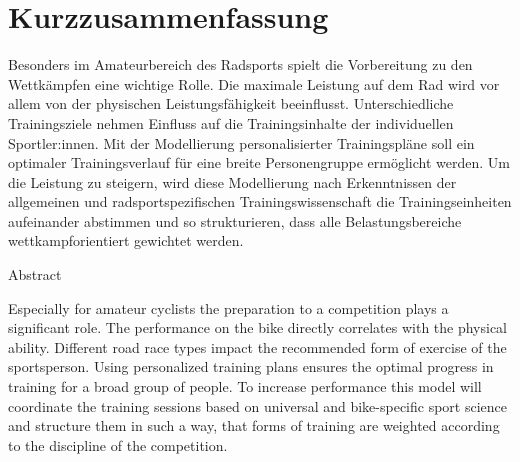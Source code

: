 \chapter*{Kurzzusammenfassung}
\label{sec:abstract}
\vspace*{-10mm}
Besonders im Amateurbereich des Radsports spielt die Vorbereitung zu den Wettkämpfen eine wichtige Rolle. Die maximale Leistung auf dem Rad wird vor allem von der physischen Leistungsfähigkeit beeinflusst. Unterschiedliche Trainingsziele nehmen Einfluss auf die Trainingsinhalte der individuellen Sportler:innen. Mit der Modellierung personalisierter Trainingspläne soll ein optimaler Trainingsverlauf für eine breite Personengruppe ermöglicht werden.
Um die Leistung zu steigern, wird diese Modellierung nach Erkenntnissen der allgemeinen und radsportspezifischen Trainingswissenschaft die Trainingseinheiten aufeinander abstimmen und so strukturieren, dass alle Belastungsbereiche wettkampforientiert gewichtet werden.
\vspace*{20mm}

{Abstract}
\label{sec:abstract-diff}

Especially for amateur cyclists the preparation to a competition plays a significant role. The performance on the bike directly correlates with the physical ability. Different road race types impact the recommended form of exercise of the sportsperson. Using personalized training plans ensures the optimal progress in training for a broad group of people.
To increase performance this model will coordinate the training sessions based on universal and bike-specific sport science and structure them in such a way, that forms of training are weighted according to the discipline of the competition.